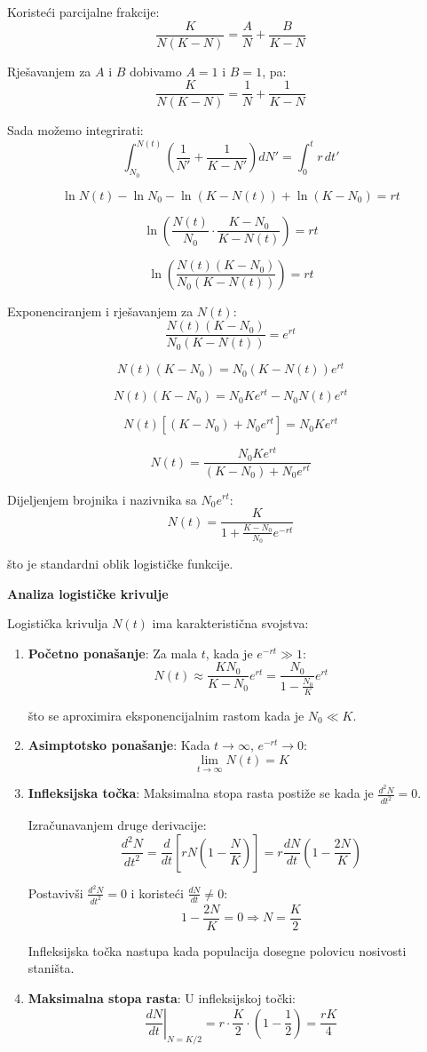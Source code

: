 \documentclass[11pt,oneside]{book}
\begin{document}
Koristeći parcijalne frakcije:
$$\frac{K}{N(K-N)} = \frac{A}{N} + \frac{B}{K-N}$$

Rješavanjem za $A$ i $B$ dobivamo $A = 1$ i $B = 1$, pa:
$$\frac{K}{N(K-N)} = \frac{1}{N} + \frac{1}{K-N}$$

Sada možemo integrirati:
$$\int_{N_0}^{N(t)} \left(\frac{1}{N'} + \frac{1}{K-N'}\right) dN' = \int_0^t r \, dt'$$

$$\ln N(t) - \ln N_0 - \ln(K-N(t)) + \ln(K-N_0) = rt$$

$$\ln\left(\frac{N(t)}{N_0} \cdot \frac{K-N_0}{K-N(t)}\right) = rt$$

$$\ln\left(\frac{N(t)(K-N_0)}{N_0(K-N(t))}\right) = rt$$

Exponenciranjem i rješavanjem za $N(t)$:
$$\frac{N(t)(K-N_0)}{N_0(K-N(t))} = e^{rt}$$

$$N(t)(K-N_0) = N_0(K-N(t))e^{rt}$$

$$N(t)(K-N_0) = N_0 K e^{rt} - N_0 N(t) e^{rt}$$

$$N(t)[(K-N_0) + N_0 e^{rt}] = N_0 K e^{rt}$$

$$N(t) = \frac{N_0 K e^{rt}}{(K-N_0) + N_0 e^{rt}}$$

Dijeljenjem brojnika i nazivnika sa $N_0 e^{rt}$:
$$N(t) = \frac{K}{1 + \frac{K-N_0}{N_0}e^{-rt}}$$

što je standardni oblik logističke funkcije.

\textbf{Analiza logističke krivulje}

Logistička krivulja $N(t)$ ima karakteristična svojstva:

\begin{enumerate}
	\item \textbf{Početno ponašanje}: Za mala $t$, kada je $e^{-rt} \gg 1$:
	$$N(t) \approx \frac{K N_0}{K-N_0} e^{rt} = \frac{N_0}{1-\frac{N_0}{K}} e^{rt}$$
	
	što se aproximira eksponencijalnim rastom kada je $N_0 \ll K$.
	
	\item \textbf{Asimptotsko ponašanje}: Kada $t \to \infty$, $e^{-rt} \to 0$:
	$$\lim_{t \to \infty} N(t) = K$$
	
	\item \textbf{Infleksijska točka}: Maksimalna stopa rasta postiže se kada je $\frac{d^2N}{dt^2} = 0$.
	
	Izračunavanjem druge derivacije:
	$$\frac{d^2N}{dt^2} = \frac{d}{dt}\left[rN\left(1-\frac{N}{K}\right)\right] = r\frac{dN}{dt}\left(1-\frac{2N}{K}\right)$$
	
	Postavivši $\frac{d^2N}{dt^2} = 0$ i koristeći $\frac{dN}{dt} \neq 0$:
	$$1-\frac{2N}{K} = 0 \Rightarrow N = \frac{K}{2}$$
	
	Infleksijska točka nastupa kada populacija dosegne polovicu nosivosti staništa.
	
	\item \textbf{Maksimalna stopa rasta}: U infleksijskoj točki:
	$$\left.\frac{dN}{dt}\right|_{N=K/2} = r \cdot \frac{K}{2} \cdot \left(1-\frac{1}{2}\right) = \frac{rK}{4}$$
\end{enumerate}
\end{document}
